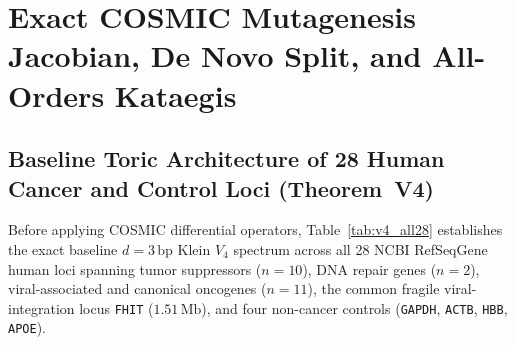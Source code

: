 \documentclass[11pt, a4paper]{article}
\DeclareRobustCommand{\_}{\textunderscore\allowbreak}
\begin{document}
\section{Exact COSMIC Mutagenesis Jacobian, De Novo Split, and All-Orders Kataegis}
\label{sec:mutagenesis}

\subsection{Baseline Toric Architecture of 28 Human Cancer and Control Loci (Theorem~V4)}

Before applying COSMIC differential operators, Table~\ref{tab:v4_all28} establishes the exact baseline $d = 3\,\mathrm{bp}$ Klein $V_4$ spectrum across all 28 NCBI RefSeqGene human loci spanning tumor suppressors ($n = 10$), DNA repair genes ($n = 2$), viral-associated and canonical oncogenes ($n = 11$), the common fragile viral-integration locus \texttt{FHIT} ($1.51\,\mathrm{Mb}$), and four non-cancer controls (\texttt{GAPDH}, \texttt{ACTB}, \texttt{HBB}, \texttt{APOE}).
\end{document}
